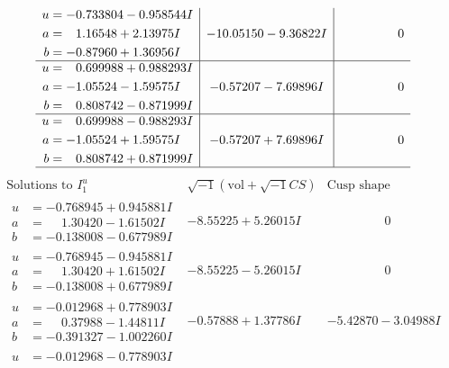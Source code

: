 \documentclass[1p]{elsarticle_modified}
\theoremstyle{definition}
\newcommand{\I}{\sqrt{-1}}
\begin{document}
$$\begin{array}{c|c|c}
\begin{aligned}
u &= -0.733804 - 0.958544 I \\
a &= \phantom{-}1.16548 + 2.13975 I \\
b &= -0.87960 + 1.36956 I\end{aligned}
 & -10.05150 - 9.36822 I & \phantom{-0.000000 } 0 \\ \hline\begin{aligned}
u &= \phantom{-}0.699988 + 0.988293 I \\
a &= -1.05524 - 1.59575 I \\
b &= \phantom{-}0.808742 - 0.871999 I\end{aligned}
 & -0.57207 - 7.69896 I & \phantom{-0.000000 } 0 \\ \hline\begin{aligned}
u &= \phantom{-}0.699988 - 0.988293 I \\
a &= -1.05524 + 1.59575 I \\
b &= \phantom{-}0.808742 + 0.871999 I\end{aligned}
 & -0.57207 + 7.69896 I & \phantom{-0.000000 } 0\\
 \hline 
 \end{array}$$\newpage$$\begin{array}{c|c|c}  
\text{Solutions to }I^u_{1}& \I (\text{vol} + \sqrt{-1}CS) & \text{Cusp shape}\\
 \hline 
\begin{aligned}
u &= -0.768945 + 0.945881 I \\
a &= \phantom{-}1.30420 - 1.61502 I \\
b &= -0.138008 - 0.677989 I\end{aligned}
 & -8.55225 + 5.26015 I & \phantom{-0.000000 } 0 \\ \hline\begin{aligned}
u &= -0.768945 - 0.945881 I \\
a &= \phantom{-}1.30420 + 1.61502 I \\
b &= -0.138008 + 0.677989 I\end{aligned}
 & -8.55225 - 5.26015 I & \phantom{-0.000000 } 0 \\ \hline\begin{aligned}
u &= -0.012968 + 0.778903 I \\
a &= \phantom{-}0.37988 - 1.44811 I \\
b &= -0.391327 - 1.002260 I\end{aligned}
 & -0.57888 + 1.37786 I & -5.42870 - 3.04988 I \\ \hline\begin{aligned}
u &= -0.012968 - 0.778903 I \\

\end{aligned}
\end{array}$$
\end{document}
